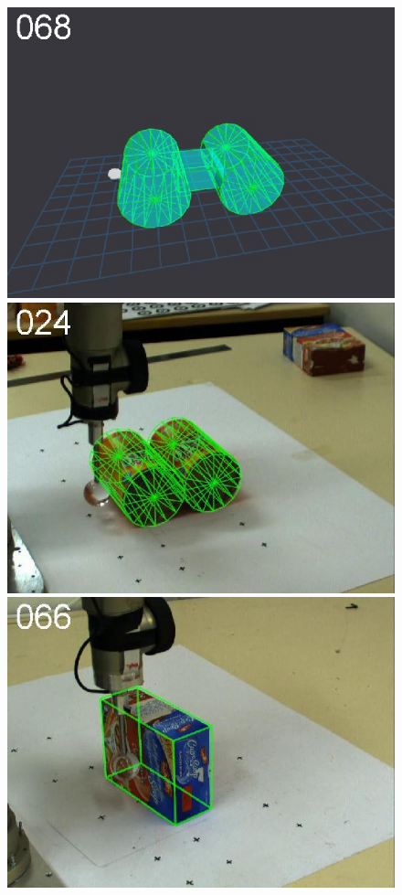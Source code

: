 \begin{figure}[t]
{\includegraphics[width=\imgCXwid]{./C5_3exp_6_1}
\includegraphics[width=\imgCXwid]{./C2_3exp_75_1}
\includegraphics[width=\imgCXwid]{./C1_1exp_87_1}
}
\end{figure}

